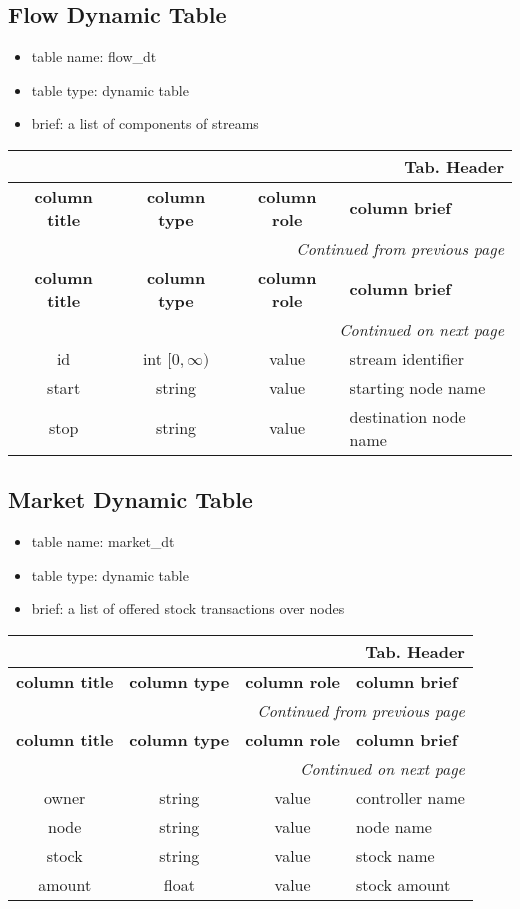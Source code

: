 \documentclass[a4paper,oneside,titlepage]{report}
\newcommand*{\LTHeaderIV}[5]{
  \multicolumn{4}{r}{\textbf{Tab. \thesubsection} \textbf{#1}}\\    
  \hline
  \textbf{#2} & \textbf{#3} & \textbf{#4} & \textbf{#5}\\
  \hline
  
  \endfirsthead
  \multicolumn{4}{r}{\textit{Continued from previous page}}\\    
  \hline
  \textbf{#2} & \textbf{#3} & \textbf{#4} & \textbf{#5}\\
  \hline
  \endhead
  \hline
  \multicolumn{4}{r}{\textit{Continued on next page}}\\
  \endfoot
  \hline
  \endlastfoot  
}
\begin{document}
\subsection{Flow Dynamic Table}
\begin{itemize}
  \setlength{\itemsep}{0pt}
  \setlength{\parskip}{0pt}
\item table name: flow\_dt  
\item table type: dynamic table   
\item brief: a list of components of streams
\end{itemize}

\vspace{-0.5cm}
\begin{longtable}{ |c|c|c|l| } 
  \LTHeaderIV{Header}{column title}{column type}{column role}{column brief}                    
  id & int $[0, \infty)$ & value & stream identifier\\
  start & string & value & starting node name\\
  stop & string & value & destination node name\\
\end{longtable}        


\subsection{Market Dynamic Table}
\begin{itemize}
  \setlength{\itemsep}{0pt}
  \setlength{\parskip}{0pt}
\item table name: market\_dt  
\item table type: dynamic table   
\item brief: a list of offered stock transactions over nodes
\end{itemize}

\begin{longtable}{ |c|c|c|l| } 
  \LTHeaderIV{Header}{column title}{column type}{column role}{column brief}                    
  owner & string & value & controller name\\
  node & string & value & node name\\
  stock & string & value & stock name\\
  amount & float & value & stock amount\\
\end{longtable}        

\end{document}
